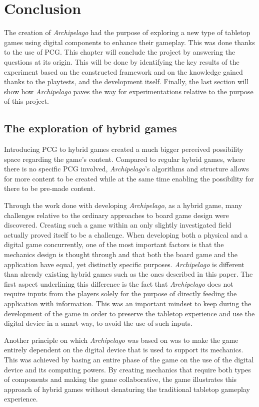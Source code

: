 \chapter{Conclusion}
The creation of \textit{Archipelago} had the purpose of exploring a new type of tabletop games using digital components to enhance their gameplay. This was done thanks to the use of PCG. This chapter will conclude the project by answering the questions at its origin. This will be done by identifying the key results of the experiment based on the constructed framework and on the knowledge gained thanks to the playtests, and the development itself. Finally, the last section will show how \textit{Archipelago} paves the way for experimentations relative to the purpose of this project.

\section{The exploration of hybrid games}
Introducing PCG to hybrid games created a much bigger perceived possibility space regarding the game's content. Compared to regular hybrid games, where there is no specific PCG involved, \textit{Archipelago}'s algorithms and structure allows for more content to be created while at the same time enabling the possibility for there to be pre-made content. 

Through the work done with developing \textit{Archipelago}, as a hybrid game, many challenges relative to the ordinary approaches to board game design were discovered. Creating such a game within an only slightly investigated field actually proved itself to be a challenge. When developing both a physical and a digital game concurrently, one of the most important factors is that the mechanics design is thought through and that both the board game and the application have equal, yet distinctly specific purposes. \textit{Archipelago} is different than already existing hybrid games such as the ones described in this paper. The first aspect underlining this difference is the fact that \textit{Archipelago} does not require inputs from the players solely for the purpose of directly feeding the application with information. This was an important mindset to keep during the development of the game in order to preserve the tabletop experience and use the digital device in a smart way, to avoid the use of such inputs.

Another principle on which \textit{Archipelago} was based on was to make the game entirely dependent on the digital device that is used to support its mechanics. This was achieved by basing an entire phase of the game on the use of the digital device and its computing powers. By creating mechanics that require both types of components and making the game collaborative, the game illustrates this approach of hybrid games without denaturing the traditional tabletop gameplay experience.

